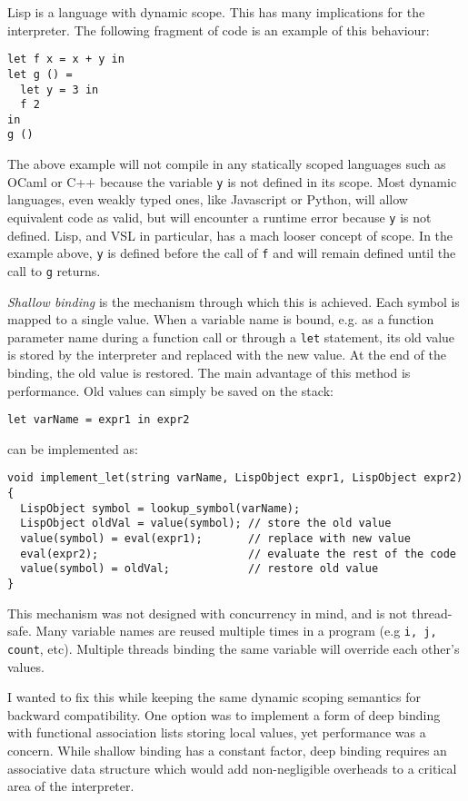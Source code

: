 Lisp is a language with dynamic scope. This has many implications for the interpreter. The following
fragment of code is an example of this behaviour:
\begin{verbatim}
let f x = x + y in
let g () =
  let y = 3 in
  f 2
in
g ()
\end{verbatim}

The above example will not compile in any statically scoped languages such as OCaml or C++
because the variable \texttt{y} is not defined in its scope.
Most dynamic languages, even weakly typed ones, like Javascript or Python, will allow equivalent
code as valid, but will encounter a runtime error because \texttt{y} is not defined.
Lisp, and VSL in particular, has a mach looser concept of scope.
In the example above, \texttt{y} is defined before the call of \texttt{f} and will remain defined until the
call to \texttt{g} returns.

\emph{Shallow binding} is the mechanism through which this is achieved. Each symbol is mapped to a single value.
When a variable name is bound, e.g. as a function parameter name during a function call or through a
\texttt{let} statement, its old value is stored by the interpreter and replaced with the new value. At the end of the binding,
the old value is restored. The main advantage of this method is performance. Old values can simply be saved
on the stack:
\begin{verbatim}
let varName = expr1 in expr2
\end{verbatim}

can be implemented as:

\begin{verbatim}
void implement_let(string varName, LispObject expr1, LispObject expr2) {
  LispObject symbol = lookup_symbol(varName);
  LispObject oldVal = value(symbol); // store the old value
  value(symbol) = eval(expr1);       // replace with new value
  eval(expr2);                       // evaluate the rest of the code
  value(symbol) = oldVal;            // restore old value
}
\end{verbatim}

This mechanism was not designed with concurrency in mind, and is not thread-safe.
Many variable names are reused multiple times in a program (e.g \texttt{i, j, count}, etc).
Multiple threads binding the same variable will override each other's values.

I wanted to fix this while keeping the same dynamic scoping semantics for backward compatibility.
One option was to implement a form of deep binding with functional association lists storing local values,
yet performance was a concern. While shallow binding has a constant factor, deep binding requires
an associative data structure which would add non-negligible overheads to a critical area of the
interpreter.

